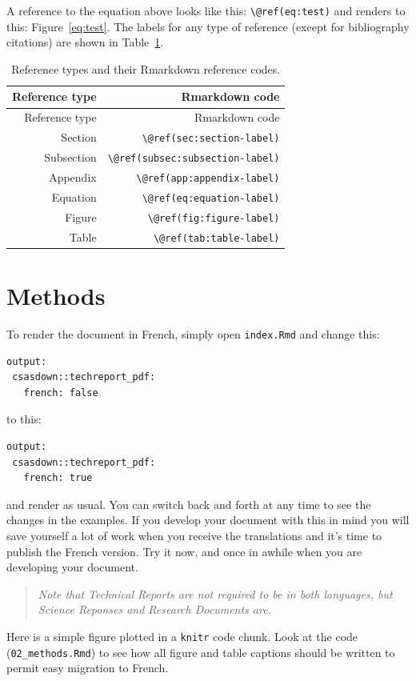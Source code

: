 \documentclass[12pt]{article}\usepackage[]{graphicx}\usepackage[]{color}
\begin{document}
A reference to the equation above looks like this: \texttt{\textbackslash{}@ref(eq:test)} and renders to this: Figure~\ref{eq:test}. The labels for any type of reference (except for bibliography citations) are shown in Table~\ref{tab:ref-tab}.
\begin{longtable}[]{@{}rr@{}}
\caption{\label{tab:ref-tab}Reference types and their Rmarkdown reference codes.}\tabularnewline
\toprule\noalign{}
Reference type & Rmarkdown code \\
\midrule\noalign{}
\endfirsthead
\toprule\noalign{}
Reference type & Rmarkdown code \\
\midrule\noalign{}
\endhead
\bottomrule\noalign{}
\endlastfoot
Section & \texttt{\textbackslash{}@ref(sec:section-label)} \\
Subsection & \texttt{\textbackslash{}@ref(subsec:subsection-label)} \\
Appendix & \texttt{\textbackslash{}@ref(app:appendix-label)} \\
Equation & \texttt{\textbackslash{}@ref(eq:equation-label)} \\
Figure & \texttt{\textbackslash{}@ref(fig:figure-label)} \\
Table & \texttt{\textbackslash{}@ref(tab:table-label)} \\
\end{longtable}
\hypertarget{methods}{%
\section{Methods}\label{methods}}

To render the document in French, simply open \texttt{index.Rmd} and change this:
\begin{verbatim}
output:
 csasdown::techreport_pdf:
   french: false
\end{verbatim}
to this:
\begin{verbatim}
output:
 csasdown::techreport_pdf:
   french: true
\end{verbatim}
and render as usual. You can switch back and forth at any time to see the changes in the examples. If you develop your document with this in mind you will save yourself a lot of work when you receive the translations and it's time to publish the French version. Try it now, and once in awhile when you are developing your document.
\begin{quote}
\emph{Note that Technical Reports are not required to be in both languages, but Science Reponses and Research Documents are.}
\end{quote}
Here is a simple figure plotted in a \texttt{knitr} code chunk. Look at the code (\texttt{02\_methods.Rmd}) to see how all figure and table captions should be written to permit easy migration to French.
\end{document}

